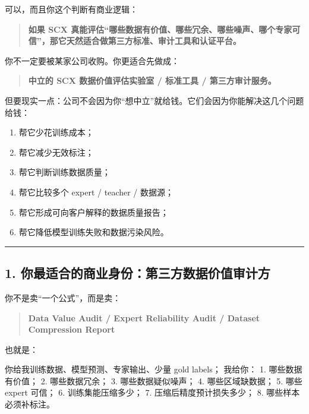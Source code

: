 \documentclass[
  12pt,
]{ctexart}
\newenvironment{Shaded}{}{}
\newcommand{\NormalTok}[1]{#1}
\providecommand{\tightlist}{%
  \setlength{\itemsep}{0pt}\setlength{\parskip}{0pt}}
\begin{document}
可以，而且你这个判断有商业逻辑：

\begin{quote}
\textbf{如果 SCX
真能评估``哪些数据有价值、哪些冗余、哪些噪声、哪个专家可信''，那它天然适合做第三方标准、审计工具和认证平台。}
\end{quote}

你不一定要被某家公司收购。你更适合先做成：

\begin{quote}
\textbf{中立的 SCX 数据价值评估实验室 / 标准工具 / 第三方审计服务。}
\end{quote}

但要现实一点：公司不会因为你``想中立''就给钱。它们会因为你能解决这几个问题给钱：

\begin{enumerate}
\def\labelenumi{\arabic{enumi}.}
\tightlist
\item
  帮它少花训练成本；
\item
  帮它减少无效标注；
\item
  帮它判断训练数据质量；
\item
  帮它比较多个 expert / teacher / 数据源；
\item
  帮它形成可向客户解释的数据质量报告；
\item
  帮它降低模型训练失败和数据污染风险。
\end{enumerate}

\begin{center}\rule{0.5\linewidth}{0.5pt}\end{center}

\subsection{1.
你最适合的商业身份：第三方数据价值审计方}\label{ux4f60ux6700ux9002ux5408ux7684ux5546ux4e1aux8eabux4efdux7b2cux4e09ux65b9ux6570ux636eux4ef7ux503cux5ba1ux8ba1ux65b9}

你不是卖``一个公式''，而是卖：

\begin{quote}
\textbf{Data Value Audit / Expert Reliability Audit / Dataset
Compression Report}
\end{quote}

也就是：

\begin{Shaded}
\begin{Highlighting}[]
\NormalTok{你给我训练数据、模型预测、专家输出、少量 gold labels；}
\NormalTok{我给你：}
\NormalTok{1. 哪些数据有价值；}
\NormalTok{2. 哪些数据冗余；}
\NormalTok{3. 哪些数据疑似噪声；}
\NormalTok{4. 哪些区域缺数据；}
\NormalTok{5. 哪些 expert 可信；}
\NormalTok{6. 训练集能压缩多少；}
\NormalTok{7. 压缩后精度预计损失多少；}
\NormalTok{8. 哪些样本必须补标注。}
\end{Highlighting}
\end{Shaded}
\end{document}
